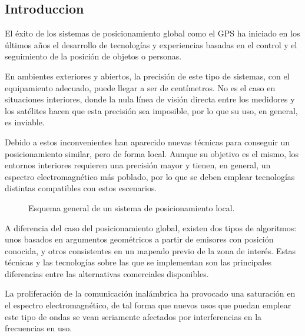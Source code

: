 \subsection{Introduccion}

El éxito de los sistemas de posicionamiento global como el GPS ha iniciado en los últimos años el desarrollo de tecnologías y experiencias basadas en el control y el seguimiento de la posición de objetos o personas.

En ambientes exteriores y abiertos, la precisión de este tipo de sistemas, con el equipamiento adecuado, puede llegar a ser de centímetros.
No es el caso en situaciones interiores, donde la nula línea de visión directa entre los medidores y los satélites hacen que esta precisión sea imposible, por lo que su uso, en general, es inviable.

Debido a estos inconvenientes han aparecido nuevas técnicas para conseguir un posicionamiento similar, pero de forma local.
Aunque su objetivo es el mismo, los entornos interiores requieren una precisión mayor y tienen, en general, un espectro electromagnético más poblado, por lo que se deben emplear tecnologías distintas compatibles con estos escenarios.

\begin{figure}[H]
    \centering
    \def\svgwidth{1.1\linewidth}
    
	\caption{Esquema general de un sistema de posicionamiento local.}
    \label{fig:Gen}
\end{figure}


A diferencia del caso del posicionamiento global, existen dos tipos de algoritmos: unos basados en argumentos geométricos a partir de emisores con posición conocida, y otros consistentes en un mapeado previo de la zona de interés.
Estas técnicas y las tecnologías sobre las que se implementan son las principales diferencias entre las alternativas comerciales disponibles.

La proliferación de la comunicación inalámbrica ha provocado una saturación en el espectro electromagnético, de tal forma que nuevos usos que puedan emplear este tipo de ondas se vean seriamente afectados por interferencias en la frecuencias en uso.

